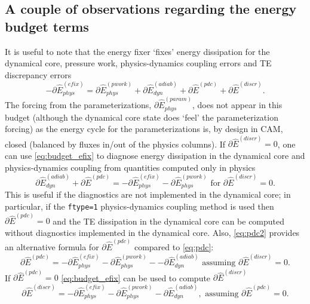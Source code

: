 \documentclass{agujournal}
\newcommand*{\gi}[1]{\widehat{#1}}
\begin{document}
\subsection{A couple of observations regarding the energy budget terms}
It is useful to note that the energy fixer `fixes' energy dissipation for the dynamical core, pressure work, physics-dynamics coupling errors and TE discrepancy errors
\begin{equation}
\label{eq:budget_efix}
-\partial \gi{E}_{phys}^{({efix})}=\partial \gi{E}_{phys}^{({pwork})}+\partial \gi{E}_{dyn}^{({adiab})}+\partial \gi{E}^{({pdc})}+\partial \gi{E}^{({discr})}.
\end{equation}
The forcing from the parameterizations, $\partial \gi{E}_{phys}^{({param})}$, does not appear in this budget (although the dynamical core state does `feel' the parameterization forcing) as the energy cycle for the parameterizations is, by design in CAM, closed (balanced by fluxes in/out of the physics columns). If $\partial \gi{E}^{({discr})}=0$, one can use \eqref{eq:budget_efix} to diagnose energy dissipation in the dynamical core and physics-dynamics coupling from quantities computed only in physics
\begin{equation}
\label{eq:pdc2}
\partial \gi{E}_{dyn}^{({adiab})}+\partial \gi{E}^{({pdc})}=-\partial \gi{E}_{phys}^{({efix})}-\partial \gi{E}_{phys}^{({pwork})} \text{ for  }\partial \gi{E}^{({discr})}=0.
\end{equation}
This is useful if the diagnostics are not implemented in the dynamical core; in particular, if the {\tt{ftype=1}} physics-dynamics coupling method is used then $\partial \gi{E}^{({pdc})}=0$ and the TE dissipation in the dynamical core can be computed without diagnostics implemented in the dynamical core. Also, \eqref{eq:pdc2} provides an alternative formula for $\partial \gi{E}^{({pdc})}$ compared to \eqref{eq:pdc}:
\begin{equation}
\label{eq:pdc3}
\partial \gi{E}^{({pdc})}=-\partial \gi{E}_{phys}^{({efix})}-\partial \gi{E}_{phys}^{({pwork})}--\partial \gi{E}_{dyn}^{({adiab})} \text{ assuming }\partial \gi{E}^{({discr})}=0.
\end{equation}
If $\partial \gi{E}^{({pdc})}=0$ \eqref{eq:budget_efix} can be used to compute $\partial \gi{E}^{({discr})}$
\begin{equation}
\label{eq:discre}
\partial \gi{E}^{({discr})}=-\partial \gi{E}_{phys}^{({efix})}-\partial \gi{E}_{phys}^{({pwork})}-\partial \gi{E}_{dyn}^{({adiab})}, \text{ assuming }\partial \gi{E}^{(pdc)}=0.
\end{equation}
\end{document}
